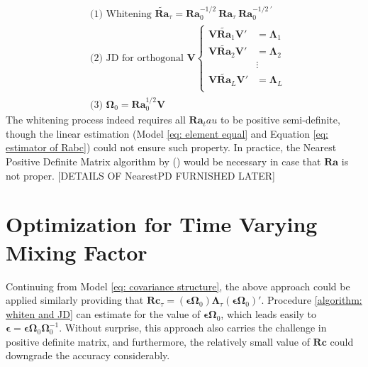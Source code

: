 \documentclass[utf8,english]{gradu3}
\begin{document}
\begin{equation}
\label{algorithm: whiten and JD}
    \begin{aligned}
& \text{(1) Whitening } \tilde {\boldsymbol{Ra}}_\tau = \boldsymbol{Ra}_0^{-1/2}\ \boldsymbol {Ra} _\tau\ \boldsymbol {Ra}_0^{-1/2\ '}
\\ & \text{(2) JD for orthogonal } \boldsymbol V \begin{cases} 
\boldsymbol V \tilde {\boldsymbol {Ra}}_1 \boldsymbol V' & =  \boldsymbol\Lambda_1 \\
\boldsymbol V \tilde {\boldsymbol {Ra}}_2 \boldsymbol V' & =  \boldsymbol\Lambda_2 \\
&\vdots \\
\boldsymbol V \tilde {\boldsymbol {Ra}}_L \boldsymbol V' & =  \boldsymbol\Lambda_L \\
\end{cases}
\\ & \text{(3) }  \boldsymbol\Omega_0 = \boldsymbol{Ra}_0^{1/2} \boldsymbol V
\end{aligned}
\end{equation}
The whitening process indeed requires all $\boldsymbol{Ra}_tau$ to be positive semi-definite, though the linear estimation (Model \ref{eq: element equal} and Equation \ref{eq: estimator of Rabc}) could not ensure such property. In practice, the Nearest Positive Definite Matrix algorithm by \citeauthor{packageMatrix} (\citeyear{packageMatrix}) would be necessary in case that $\boldsymbol{Ra}$ is not proper. [DETAILS OF NearestPD FURNISHED LATER]

\section{Optimization for Time Varying Mixing Factor}

Continuing from Model \ref{eq: covariance structure}, the above approach could be applied similarly providing that $\boldsymbol{Rc}_\tau = (\boldsymbol{\epsilon} \boldsymbol\Omega_0) \boldsymbol\Lambda_\tau (\boldsymbol{\epsilon\Omega}_0 )'$. Procedure \ref{algorithm: whiten and JD} can estimate for the value of $\boldsymbol{\epsilon\Omega}_0$, which leads easily to $\boldsymbol{\epsilon} = \boldsymbol{\epsilon\Omega}_0\boldsymbol{\Omega}_0^{-1}$. Without surprise, this approach also carries the challenge in positive definite matrix, and furthermore, the relatively small value of $\boldsymbol{Rc}$ could downgrade the accuracy considerably.
\end{document}
